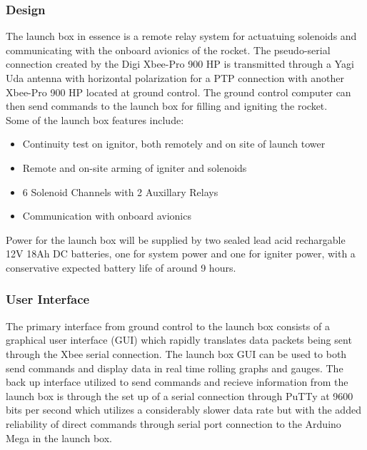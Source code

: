 \documentclass[10pt,a4paper]{article}
\begin{document}
\subsubsection{Design}
The launch box in essence is a remote relay system for actuatuing solenoids and communicating with the onboard avionics of the rocket. The pseudo-serial connection created by the Digi Xbee-Pro 900 HP is transmitted through a Yagi Uda antenna with horizontal polarization for a PTP connection with another Xbee-Pro 900 HP located at ground control. The ground control computer can then send commands to the launch box for filling and igniting the rocket.\\

Some of the launch box features include:
\begin{itemize}
	\item Continuity test on ignitor, both remotely and on site of launch tower
	\item Remote and on-site arming of igniter and solenoids
	\item 6 Solenoid Channels with 2 Auxillary Relays
	\item Communication with onboard avionics
\end{itemize}
Power for the launch box will be supplied by two sealed lead acid rechargable 12V 18Ah DC batteries, one for system power and one for igniter power, with a conservative expected battery life of around 9 hours.
\subsubsection{User Interface}
The primary interface from ground control to the launch box consists of a graphical user interface (GUI) which rapidly translates data packets being sent through the Xbee serial connection. The launch box GUI can be used to both send commands and display data in real time rolling graphs and gauges. The back up interface utilized to send commands and recieve information from the launch box is through the set up of a serial connection through PuTTy at 9600 bits per second which utilizes a considerably slower data rate but with the added reliability of direct commands through serial port connection to the Arduino Mega in the launch box.\\
\end{document}
